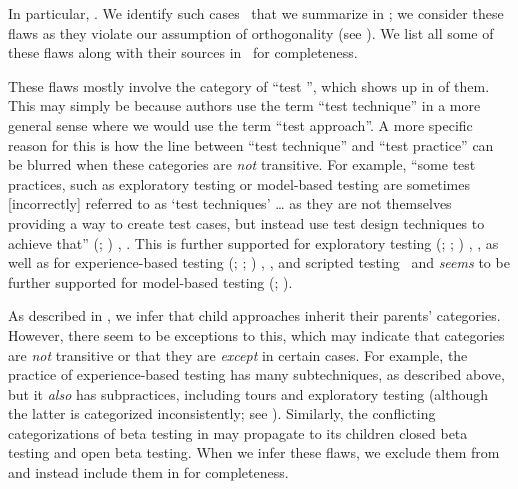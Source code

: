 \ifnotpaper\else\fi

\label{multiCats}
In particular, \multiCatIntro{}. We identify \multiCatCount{} such cases%
\ifnotpaper\ that we summarize in \fi; we consider these
flaws as they violate our assumption of orthogonality (see
). We list \ifnotpaper all \else some \fi of these flaws
along with their sources in \ifnotpaper\ for completeness.
    \begin{table}
        \vspace{-0.5cm}
        
        \vspace{-1cm}
    \end{table}
\fi These flaws mostly involve the category of ``test \multiCatMax{}'', which
shows up in \multiCatMaxCount{} of them. This may simply be because authors use
the term ``test technique'' in a more general sense where we would use the term
``test approach''.\label{cats-intrans} A more
specific reason for this is how the line between ``test technique'' and
``test practice'' can be blurred when these categories are \emph{not}
transitive. For example, ``some test practices, such as exploratory testing or
model-based testing are sometimes [incorrectly] referred to as `test techniques'
\dots{} as they are not themselves providing a way to create test cases, but
instead use test design techniques to achieve that'' \ifnotpaper
    (\citealp[p.~11]{IEEE2022}; \citeyear[p.~5]{IEEE2021a})\else
    \cite[p.~11]{IEEE2022}, \cite[p.~5]{IEEE2021a}\fi. This is further
supported for exploratory testing \ifnotpaper (\citeyear[p.~33]{IEEE2022};
    \citeyear[p.~viii]{IEEE2021c}; \citeyear[p.~13]{IEEE2013}) \else
    \cite[p.~33]{IEEE2022}, \cite[p.~viii]{IEEE2021c}, \cite[p.~13]{IEEE2013}
\fi as well as for experience-based testing \ifnotpaper
    (\citeyear[p.~4]{IEEE2022}; \citeyear[pp.~viii, 4]{IEEE2021c};
    \citeyear[p.~33]{IEEE2013}) \else \cite[p.~4]{IEEE2022},
    \cite[pp.~viii, 4]{IEEE2021c}, \cite[p.~33]{IEEE2013} \fi and scripted
testing \citeyearpar[p.~33]{IEEE2022}\ifnotpaper\ and \emph{seems} to be
    further supported for model-based testing
    (\citealp[pp.~1\==2]{EngströmAndPetersen2015}; \citealp[p.~4]{Kam2008})\fi.

\ifnotpaper
    As described in , we infer that child approaches inherit their
    parents' categories. However, there seem to be exceptions to this, which
    may indicate that categories are \emph{not} transitive or that they are
    \emph{except} in certain cases. For example, the practice of experience-based
    testing has many subtechniques, as described above, but it \emph{also} has
    subpractices, including tours \citep[p.~34]{IEEE2022} and exploratory testing
    (although the latter is categorized inconsistently; see ).
    Similarly, the conflicting categorizations of beta testing in
     may propagate to its children closed beta testing and
    open beta testing. When we infer these flaws, we exclude them from
     and instead include them in
     for completeness.
\fi

